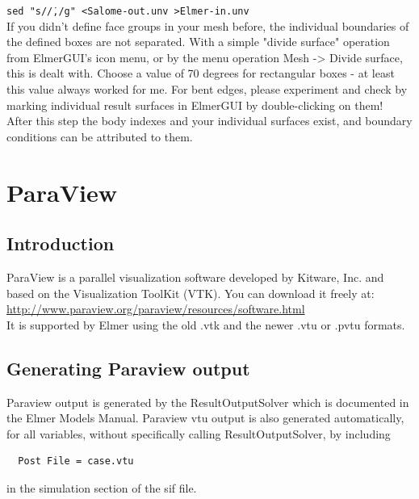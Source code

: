 \texttt{sed "s/\./,/g" <Salome-out.unv >Elmer-in.unv}\\

If you didn't define face groups in your mesh before, the individual boundaries of the defined boxes are not separated. With a simple "divide surface" operation from ElmerGUI's icon menu, or by the menu operation Mesh -> Divide surface, this is dealt with. Choose a value of 70 degrees for rectangular boxes - at least this value always worked for me. For bent edges, please experiment and check by marking individual result surfaces in ElmerGUI by double-clicking on them!\\

After this step the body indexes and your individual surfaces exist, and boundary conditions can be attributed to them. 

\newpage

\section{ParaView}

\subsection{Introduction}

ParaView is a parallel visualization software developed by Kitware, Inc. and based on the Visualization ToolKit (VTK). You can download it freely at:\\

\url{http://www.paraview.org/paraview/resources/software.html}\\

\noindent It is supported by Elmer using the old .vtk and the newer .vtu or .pvtu formats. 

\subsection{Generating Paraview output}

Paraview output is generated by the ResultOutputSolver which is documented in the Elmer Models Manual.  Paraview vtu output is also generated automatically, for all variables, without specifically calling ResultOutputSolver, by including 

\begin{verbatim}
  Post File = case.vtu
\end{verbatim}
 \noindent in the simulation section of the sif file.

